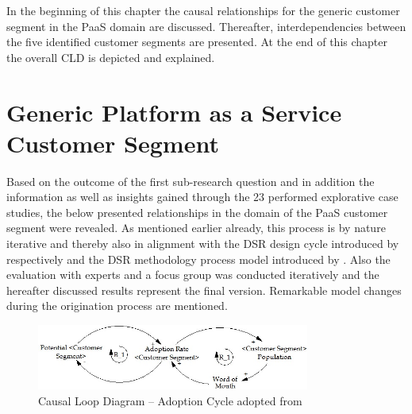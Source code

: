 In the beginning of this chapter the causal relationships for the generic customer segment in the \ac{PaaS} domain are discussed. Thereafter, interdependencies between the five identified customer segments are presented. At the end of this chapter the overall \ac{CLD} is depicted and explained.

\section{Generic Platform as a Service Customer Segment}\label{ch:cld:cs}

Based on the outcome of the first sub-research question and in addition the information as well as insights gained through the 23 performed explorative case studies, the below presented relationships in the domain of the \ac{PaaS} customer segment were revealed. As mentioned earlier already, this process is by nature iterative and thereby also in alignment with the \ac{DSR} design cycle introduced by \citet{Hevner2004} respectively \citet{Hevner2007} and the \ac{DSR} methodology process model introduced by \citet{Peffers2007}. Also the evaluation with experts and a focus group was conducted iteratively and the hereafter discussed results represent the final version. Remarkable model changes during the origination process are mentioned.

\begin{figure}[tb]
	\centering
	\includegraphics[width=0.8\textwidth]{gfx/cld_adoptionRate}
	\caption[Causal Loop Diagram -- Adoption Cycle]{Causal Loop Diagram -- Adoption Cycle adopted from \citet[p. 18]{Sterman2001}}
	\label{fig:cld_ac}
\end{figure}

